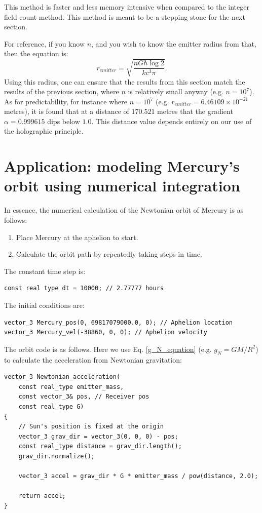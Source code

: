 \documentclass[12pt]{article}
\begin{document}
This method is faster and less memory intensive when compared to the integer field count method.
This method is meant to be a stepping stone for the next section.

For reference, if you know $n$, and you wish to know the emitter radius from that, then the equation is:
\begin{equation}
r_{\textit{emitter}} = \sqrt{\frac{n G \hbar \log 2}{k c^3 \pi}}.
\end{equation}
Using this radius, one can ensure that the results from this section match the results of the previous section, where $n$ is relatively small anyway (e.g. $n = 10^7$).
As for predictability, for instance where $n = 10^7$ (e.g. $r_{\textit{emitter}} = 6.46109 \times 10^{-21}$ metres), it is found that at a distance of $170.521$ metres that the gradient $\alpha = 0.999615$ dips below $1.0$.
This distance value depends entirely on our use of the holographic principle.




\section{Application: modeling Mercury's orbit using numerical integration}

In essence, the numerical calculation of the Newtonian orbit of Mercury is as follows:
\begin{enumerate}
\item Place Mercury at the aphelion to start.
\item Calculate the orbit path by repeatedly taking steps in time.
\end{enumerate}

The constant time step is:
\begin{lstlisting}
const real type dt = 10000; // 2.77777 hours
\end{lstlisting}

The initial conditions are:
\begin{lstlisting}
vector_3 Mercury_pos(0, 69817079000.0, 0); // Aphelion location
vector_3 Mercury_vel(-38860, 0, 0); // Aphelion velocity
\end{lstlisting}

The orbit code is as follows. 
Here we use Eq. \ref{g_N_equation} (e.g. $g_N = {G M}/{R^2}$) to calculate the acceleration from Newtonian gravitation:
\begin{lstlisting}
vector_3 Newtonian_acceleration(
	const real_type emitter_mass,
	const vector_3& pos, // Receiver pos
	const real_type G)
{
	// Sun's position is fixed at the origin
	vector_3 grav_dir = vector_3(0, 0, 0) - pos;
	const real_type distance = grav_dir.length();
	grav_dir.normalize();

	vector_3 accel = grav_dir * G * emitter_mass / pow(distance, 2.0);

	return accel;
}
\end{lstlisting}
\end{document}
